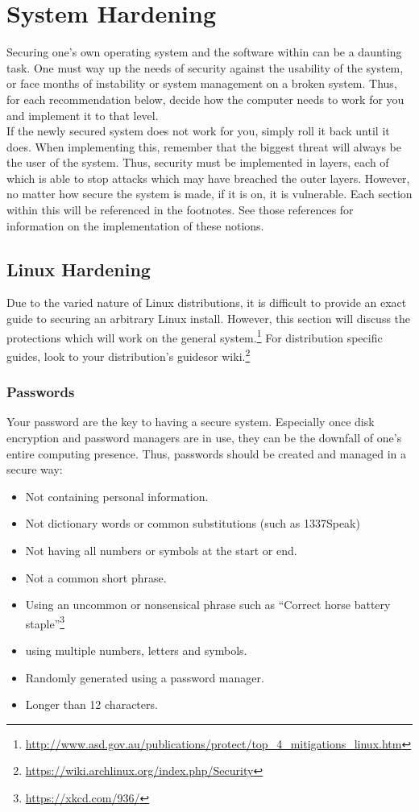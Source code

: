 \chapter{System Hardening}
	\label{ch:SystemHardening}
	Securing one's own operating system and the software within can be a daunting task.
	One must way up the needs of security against the usability of the system, or face months of instability or system management on a broken system.
	Thus, for each recommendation below, decide how the computer needs to work for you and implement it to that level.\\
	If the newly secured system does not work for you, simply roll it back until it does.
	When implementing this, remember that the biggest threat will always be the user of the system.
	Thus, security must be implemented in layers, each of which is able to stop attacks which may have breached the outer layers. However, no matter how secure the system is made, if it is on, it is vulnerable.
	Each section within this will be referenced in the footnotes. See those references for information on the implementation of these notions.
	\section{Linux Hardening}
		Due to the varied nature of Linux distributions, it is difficult to provide an exact guide to securing an arbitrary Linux install.
		However, this section will discuss the protections which will work on the general system.\footnote{\url{http://www.asd.gov.au/publications/protect/top\_4\_mitigations\_linux.htm}}
		For distribution specific guides, look to your distribution's guides\cite{FedoraSecGuide}or wiki.\footnote{\url{https://wiki.archlinux.org/index.php/Security}}
		\subsection{Passwords}
			Your password are the key to having a secure system.
			Especially once disk encryption and password managers are in use, they can be the downfall of one's entire computing presence.
			Thus, passwords should be created and managed in a secure way:
			\begin{itemize}
				\item Not containing personal information.
				\item Not dictionary words or common substitutions (such as 1337Speak)
				\item Not having all numbers or symbols at the start or end.
				\item Not a common short phrase.
				\item Using an uncommon or nonsensical phrase such as ``Correct horse battery staple''\footnote{\url{https://xkcd.com/936/}}
				\item using multiple numbers, letters and symbols.
				\item Randomly generated using a password manager. %
				\item Longer than 12 characters.
			\end{itemize}
